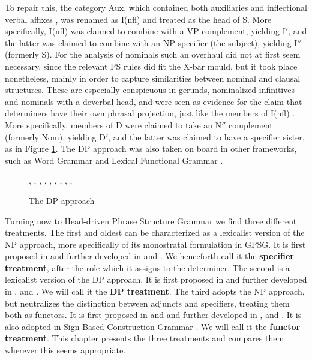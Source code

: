 \documentclass[output=paper]{langsci/langscibook}
\begin{document}
\noindent
To repair this, the category Aux, which contained both auxiliaries and 
inflectional verbal affixes \citep{Chomsky57}, was renamed as I(nfl) and treated as the head of S. 
More specifically, I(nfl) was claimed to combine with a VP complement, yielding I$'$, 
and the latter was claimed to combine with an NP specifier (the subject), yielding I$''$
(formerly S).
For the analysis of nominals such an overhaul did not at first seem necessary, 
since the relevant PS rules did fit the X-bar mould, but it took place nonetheless, 
mainly in order to capture similarities between nominal and clausal structures. 
These are especially conspicuous in gerunds, nominalized infinitives and nominals 
with a deverbal head, and were seen as evidence for the claim that determiners have their 
own phrasal projection, just like the members of I(nfl) \citep{Abney87}. 
More specifically, members of D were claimed to take an N$''$ complement (formerly Nom), 
yielding D$'$, and the latter was claimed to have a specifier sister, as in Figure \ref{abn}.
The DP approach was also taken on board in other frameworks, 
such as Word Grammar \citep{Hudson90} and Lexical Functional Grammar \citep[99]{Bresnan00}. 

\begin{figure}
\begin{center}
\footnotesize
\tree
{,
  {,
    {,
      {}},
    {,
      {,
        {,
          {}},
        {, 
          {}}}}}}
\caption{\label{abn} The DP approach } 
\normalsize
\end{center}
\end{figure}
     
Turning now to Head-driven Phrase Structure Grammar we find three different treatments.  
The first and oldest can be characterized as a lexicalist version of the NP approach, more 
specifically of its monostratal formulation in GPSG.  
It is first proposed in \citet{PS87} and further developed in \citet{PS94} and 
\citet{GS00}. We henceforth call it the {\bf specifier treatment}, 
after the role which it assigns to the determiner. 
The second is a lexicalist version of the DP approach.  
It is first proposed in \citet{Netter94} and further developed in \citet{Netter96},
and \citet{NerbonneMullen00}. We will call it the {\bf DP treatment}. 
The third adopts the NP approach, but neutralizes the distinction between adjuncts and specifiers, 
treating them both as functors. It is first proposed in \citet{VanEynde98a} and 
\citet{Allegranza98} and further developed in \citet{VanEynde03}, \citet{VanEynde06} 
and \citet{Allegranza06}. It is also adopted in Sign-Based Construction Grammar \citep{Sag2012}. 
We will call it the {\bf functor treatment}. This chapter presents the three treatments and 
compares them wherever this seems appropriate.  
\end{document}
